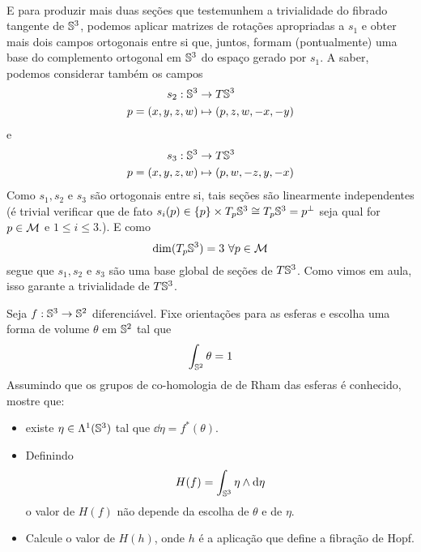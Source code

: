 \begin{dem}
\[\begin{aligned}
\end{aligned}
\]
E para produzir mais duas seções que testemunhem a trivialidade do fibrado tangente de $\S^3$, podemos aplicar matrizes de rotações apropriadas a $s_1$ e obter mais dois campos ortogonais entre si que, juntos, formam (pontualmente) uma base do complemento ortogonal em $\S^3$ do espaço gerado por $s_1$. A saber, podemos considerar também os campos
\[\begin{aligned}
s_2: \S^3 &\to T\S^3 \\
p = (x, y, z, w) &\mapsto (p, z, w, -x, -y)
\end{aligned}
\] 
e 
\[\begin{aligned}
s_3: \S^3 &\to T\S^3 \\
p = (x, y, z, w) &\mapsto (p, w, -z, y, -x)
\end{aligned}
\] 
Como $s_1, s_2$ e $s_3$ são ortogonais entre si, tais seções são linearmente independentes (é trivial verificar que de fato $s_i(p) \in \{p\} \times T_{p} \S^3 \cong T_p \S^3 = p^{\perp}$ seja qual for $p \in \mm$ e $1 \leq i \leq 3$.). E como $$\dim(T_p \S^3) = 3 \ \forall p \in \mm$$
segue que $s_1, s_2$ e $s_3$ são uma base global de seções de $T \S^3$.  Como vimos em aula, isso garante a trivialidade de $T \S^3$.
\end{dem}



\begin{Mybox}
Seja $f: \S^3 \to \S^2$ diferenciável. Fixe orientações para as esferas e escolha uma forma de volume $\theta$ em $\S^2$ tal que \[\int_{\S^2} \theta = 1 \]
Assumindo que os grupos de co-homologia de de Rham das esferas é conhecido, mostre que:
\begin{itemize}
\item existe $\eta \in \Lambda^1(\S^3)$ tal que $\dd \eta = f^{*}(\theta)$.
\item Definindo
\[
H(f) = \int_{\S^3} \eta \wg \dd \eta
\]
o valor de $H(f)$ não depende da escolha de $\theta$ e de $\eta$.
\item Calcule o valor de $H(h)$, onde $h$ é a aplicação que define a fibração de Hopf.
\end{itemize}
\vspace{-.4cm}
\end{Mybox}
\vspace{-.4cm}

